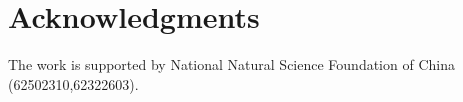 \section*{Acknowledgments}

The work is supported by National Natural Science
Foundation of China (62502310,62322603).